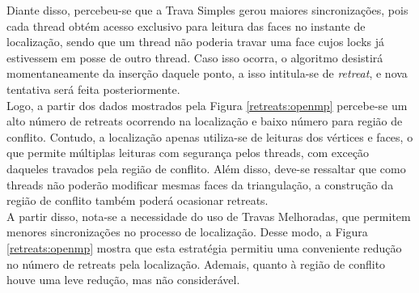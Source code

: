 \documentclass[a4paper, 12pt]{article}
\begin{document}
\begin{center}
\label{exec:parcelas}
\end{center}

Diante disso, percebeu-se que a Trava Simples gerou maiores sincronizações, pois cada thread obtém acesso exclusivo para leitura
das faces no instante de localização, sendo que um thread não poderia travar uma face cujos locks já estivessem em posse de outro thread.
Caso isso ocorra, o algoritmo desistirá momentaneamente da inserção daquele ponto, a isso intitula-se de \textit{retreat}, e nova 
tentativa será feita posteriormente. \\ 

Logo, a partir dos dados mostrados pela Figura \ref{retreats:openmp} percebe-se um alto número de retreats ocorrendo na localização e baixo número
para região de conflito. Contudo, a localização apenas utiliza-se de leituras dos vértices e faces, o que permite múltiplas leituras com segurança
pelos threads, com exceção daqueles travados pela região de conflito. Além disso, deve-se ressaltar que como threads não poderão 
modificar mesmas faces da triangulação, a construção da região de conflito também poderá ocasionar retreats.\\

A partir disso, nota-se a necessidade do uso de Travas Melhoradas, que permitem menores sincronizações no processo de localização.
Desse modo, a Figura \ref{retreats:openmp} mostra que esta estratégia permitiu uma conveniente redução no número de retreats pela localização.
Ademais, quanto à região de conflito houve uma leve redução, mas não considerável. \\
\end{document}
